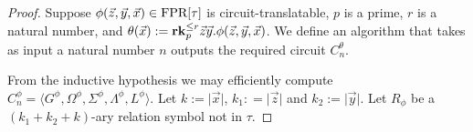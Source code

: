 \documentclass[../paper.tex]{subfiles}
\begin{document}
\begin{proof}


  Suppose $\phi(\vec{z}, \vec{y}, \vec{x}) \in \text{\upshape FPR}[\tau]$ is
  circuit-translatable, $p$ is a prime, $r$ is a natural number, and
  $\theta(\vec{x}) := \text{\textbf{rk}}^{\leq r}_p \vec{z} \vec{y}. \phi(\vec{z}, \vec{y},
  \vec{x})$. We define an algorithm that takes as input a natural number $n$
  outputs the required circuit $C^{\theta}_n$.

  From the inductive hypothesis we may efficiently compute $C^{\phi}_n = \langle
  G^{\phi}, \Omega^{\phi}, \Sigma^{\phi}, \Lambda^{\phi}, L^{\phi} \rangle$. Let
  $k:= \vert \vec{x} \vert$, $k_1 : = \vert \vec{z} \vert$ and $k_2 := \vert
  \vec{y} \vert$. Let $R_\phi$ be a $(k_1 + k_2 + k)$-ary relation symbol not in
  $\tau$.


\end{proof}
\end{document}
